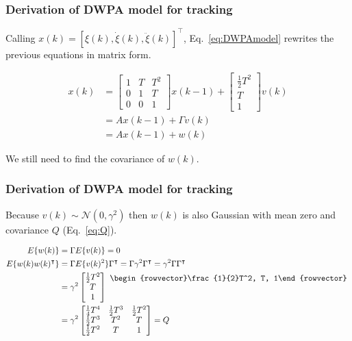 \begin{frame}
    \frametitle{Derivation of DWPA model for tracking}

    Calling $x(k)=[\xi(k), \dot{\xi}(k), \ddot{\xi}(k)]^\intercal$,
    Eq.~\ref{eq:DWPAmodel} rewrites the previous
    equations in matrix form.

    \begin{align}
        x(k)&=\begin{bmatrix}
            1 & T & T^2\\
            0 & 1 & T\\
            0 & 0 & 1
            \end{bmatrix}
           x(k-1)+
           \begin{bmatrix}
               \frac{1}{2}T^2\\
               T\\
               1
           \end{bmatrix}
           v(k)\nonumber\\
           &=Ax(k-1)+\Gamma v(k)\nonumber\\
           &=Ax(k-1)+w(k)\label{eq:DWPAmodel}
    \end{align}

    We still need to find the covariance of $w(k)$.

\end{frame}

\begin{frame}
    \frametitle{Derivation of DWPA model for tracking}

    Because $v(k)\sim\mathcal{N}(0,\gamma^2)$ then $w(k)$ is also Gaussian with
    mean zero and covariance $Q$ (Eq.~\ref{eq:Q}).

    \begin{align}
        E\{w(k)\}&=\Gamma E\{v(k)\}=0\nonumber{}\\
        E\{w(k)w(k)^\intercal\}&=\Gamma E\{v(k)^2\}\Gamma^\intercal=\Gamma\gamma^2\Gamma^\intercal=\gamma^2\Gamma\Gamma^\intercal\nonumber\\
        &=\gamma^2\begin{bmatrix}
            \frac{1}{2}T^2\\
            T\\
            1
        \end{bmatrix}
        \raisebox{2.5ex}{
            $\begin{rowvector}\frac{1}{2}T^2, T, 1\end{rowvector}$
        }\nonumber\\
        &=\gamma^2\begin{bmatrix}
                    \frac{1}{4}T^4&\frac{1}{2}T^3&\frac{1}{2}T^2\\
                    \frac{1}{2}T^3&T^2&T\\
                    \frac{1}{2}T^2&T&1
        \end{bmatrix}=Q
        \label{eq:Q}
    \end{align}

\end{frame}

